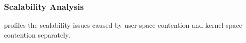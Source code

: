  
\subsubsection{Scalability Analysis} 
\label{sec:scaleidea}

\MP{} profiles the scalability issues caused by user-space contention and kernel-space contention separately. 

